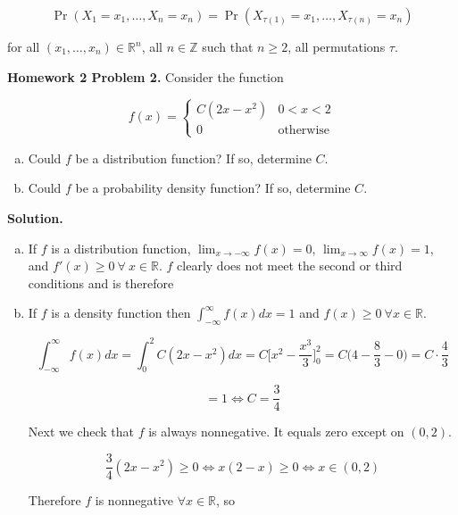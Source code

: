 \[
\Pr(X_1 = x_1, \ldots, X_n = x_n) = \Pr(X_{\tau(1)} = x_1, \ldots, X_{\tau(n)} = x_n) 
\]

for all \((x_1, \ldots, x_n) \in \mathbb{R}^n\), all \(n \in \mathbb{Z} \) such that \(n \geq 2\), all permutations \(\tau\). 

\textbf{Homework 2 Problem 2.} Consider the function

\[
f(x) = \begin{cases}
C(2x - x^2) & 0 < x < 2 \\
0 & \text{otherwise}
\end{cases}
\]

\begin{enumerate}[(a)]

\item Could \(f\) be a distribution function? If so, determine \(C\).

\item Could \(f\) be a probability density function? If so, determine \(C\).

\end{enumerate}

\textbf{Solution.} 

\begin{enumerate}[(a)]

\item If \(f\) is a distribution function, \(\lim_{x \to -\infty} f(x) = 0\), \(\lim_{x \to \infty} f(x) = 1\), and \(f'(x) \geq 0 \ \forall \ x \in \mathbb{R}\). \(f\) clearly does not meet the second or third conditions and is therefore 

\item If \(f\) is a density function then \(\int_{-\infty}^{\infty} f(x) dx = 1\) and \(f(x) \geq 0 \ \forall x \in \mathbb{R}\). 

\[
\int_{-\infty}^{\infty} f(x) dx = \int_{0}^2 C(2x - x^2) dx = C \bigg[ x^2 - \frac{x^3}{3}\bigg]_0^2 = C \bigg( 4 - \frac{8}{3} - 0\bigg) = C \cdot \frac{4}{3} 
\]

\[
= 1 \iff C = \frac{3}{4}
\]

Next we check that \(f\) is always nonnegative. It equals zero except on \((0, 2)\). 

\[
\frac{3}{4}(2x -  x^2) \geq 0 \iff x(2 - x) \geq 0 \iff x \in (0, 2)
\]

Therefore \(f\) is nonnegative \(\forall x \in \mathbb{R}\), so 

\end{enumerate}

